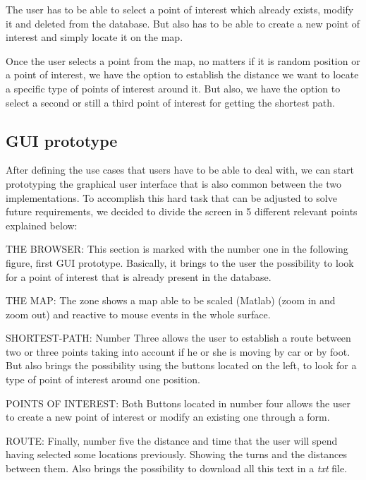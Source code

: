 \documentclass{article}
\begin{document}
The user has to be able to select a point of interest which already exists, modify it and deleted from the database. But also has to be able to create a new point of interest and simply locate it on the map.

Once the user selects a point from the map, no matters if it is random position or a point of interest, we have the option to establish the distance we want to locate a specific type of points of interest around it. But also, we have the option to select a second or still a third point of interest for getting the shortest path.

\subsection{GUI prototype}
After defining the use cases that users have to be able to deal with, we can start prototyping the graphical user interface that is also common between the two implementations. To accomplish this hard task that can be adjusted to solve future requirements, we decided to divide the screen in 5 different relevant points explained below:

THE BROWSER: This section is marked with the number one in the following figure, first GUI prototype. Basically, it brings to the user the possibility to look for a point of interest that is already present in the database.

THE MAP: The zone shows a map able to be scaled (Matlab) (zoom in and zoom out) and reactive to mouse events in the whole surface.

SHORTEST-PATH: Number Three allows the user to establish a route between two or three points taking into account if he or she is moving by car or by foot. But also brings the possibility using the buttons located on the left, to look for a type of point of interest around one position.

POINTS OF INTEREST: Both Buttons located in number four allows the user to create a new point of interest or modify an existing one through a form.

ROUTE: Finally, number five the distance and time that the user will spend having selected some locations previously. Showing the turns and the distances between them. Also brings the possibility to download all this text in a \textit{txt} file.
\end{document}
